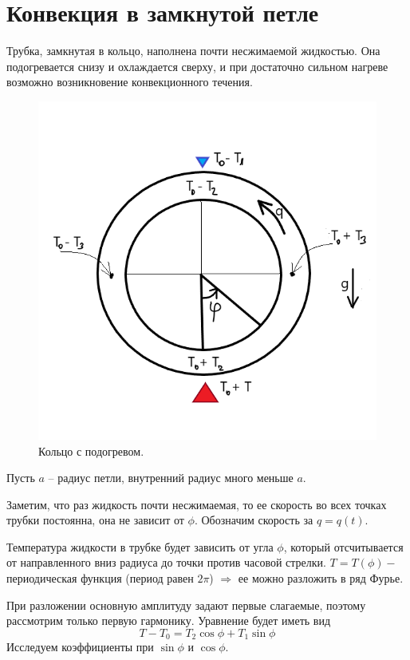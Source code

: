 \documentclass[12pt]{article}
\begin{document}
\section{Конвекция в замкнутой петле}

Трубка, замкнутая в кольцо, наполнена почти несжимаемой жидкостью. Она подогревается снизу и охлаждается сверху, и при достаточно сильном нагреве возможно возникновение конвекционного течения.

\begin{figure}[h]
	\centering
 	\includegraphics[scale=0.365]{Lorenz.png}
 	\caption{Кольцо с подогревом.}
\end{figure}

Пусть $a$ -- радиус петли, внутренний радиус много меньше $a$.

Заметим, что раз жидкость почти несжимаемая, то ее скорость во всех точках трубки постоянна, она не зависит от $\phi$. Обозначим скорость за $q = q(t)$.

Температура жидкости в трубке будет зависить от угла $\phi$, который отсчитывается от направленного вниз радиуса до точки против часовой стрелки. $T = T(\phi) -$ периодическая функция (период равен $2\pi$) $\Rightarrow$ ее можно разложить в ряд Фурье.

При разложении основную амплитуду задают первые слагаемые, поэтому рассмотрим только первую гармонику. Уравнение будет иметь вид 
\begin{equation}\label{eq1}
T - T_0 = T_2\cos\phi + T_1\sin\phi
\end{equation}
Исследуем коэффициенты при $\sin\phi$ и $\cos\phi$.
\end{document}

